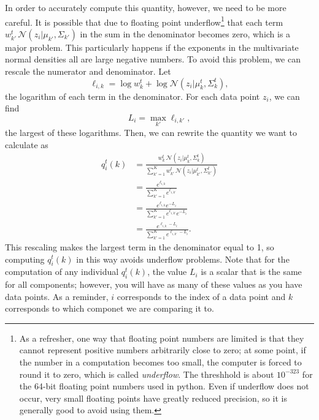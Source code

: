 In order to accurately compute this quantity, however, we need to be more careful.
It is possible that due to floating point underflow\footnote{As a refresher, one way that floating point numbers are limited is that they cannot represent positive numbers arbitrarily close to zero; at some point, if the number in a computation becomes too small, the computer is forced to round it to zero, which is called \emph{underflow}. The threshhold is about \(10^{-323}\) for the 64-bit floating point numbers used in python. Even if underflow does not occur, very small floating points have greatly reduced precision, so it is generally good to avoid using them.} that each term 
\(
w_{k'}^t \,\mathcal{N}(z_i| \mu_{k'},\Sigma_{k'})
\)
in the sum in the denominator becomes zero, which is a major problem.
This particularly happens if the exponents in the multivariate normal densities all are large negative numbers.
To avoid this problem, we can rescale the numerator and denominator.
Let 
\[
\ell_{i,k} = \log w_{k}^t +\log\mathcal{N}(z_i| \mu_{k}^t,\Sigma_{k}^t),\]
the logarithm of each term in the denominator.
For each data point \(z_i\), we can find
\[
L_i
=\max_{k'} \ell_{i,{k'}},
\]
the largest of these logarithms.
Then, we can rewrite the quantity we want to calculate as
\begin{align*}
q_i^t(k) &=
\frac{
w_k^t \,\mathcal{N}(z_i| \mu_k^t,\Sigma_k^t)
}{
\sum_{k'=1}^K
w_{k'}^t \,\mathcal{N}(z_i| \mu_{k'}^t,\Sigma_{k'}^t)
}
\\
&=
\frac{
e^{\ell_{i,k}}
}{
\sum_{k'=1}^K
e^{\ell_{i,k'}}
}
\\
&=
\frac{
e^{\ell_{i,k}}e^{-L_i}
}{
\sum_{k'=1}^K
e^{\ell_{i,k'}}e^{-L_i}
}
\\
&=
\frac{
e^{\ell_{i,k}-L_i}
}{
\sum_{k'=1}^K
e^{\ell_{i,k'}-L_i}
}.
\end{align*}
This rescaling makes the largest term in the denominator equal to 1, so computing \(q_i^t(k)\) in this way avoids underflow problems.
Note that for the computation of any individual \(q_i^t(k)\), the value \(L_i\) is a scalar that is the same for all components; however, you will have as many of these values as you have data points.
As a reminder, \(i\) corresponds to the index of a data point and \(k\) corresponds to which componet we are comparing it to.


